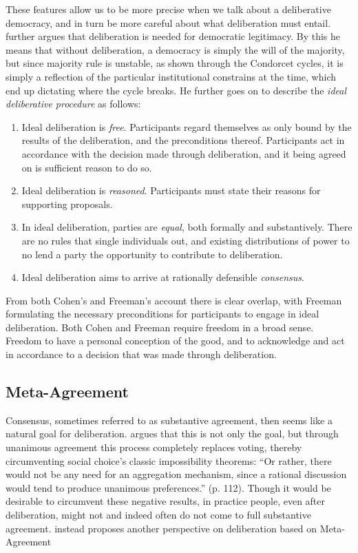 These features allow us to be more precise when we talk about a deliberative
democracy, and in turn be more careful about what deliberation must entail.
\citet{cohenDeliberationDemocraticLegimitimacy2002} further argues that
deliberation is needed for democratic legitimacy. By this he means that without
deliberation, a democracy is simply the will of the majority, but since
majority rule is unstable, as shown through the Condorcet cycles, it is simply
a reflection of the particular institutional constrains at the time, which end
up dictating where the cycle breaks. He further goes on to describe the
\emph{ideal deliberative procedure} as follows:

\begin{enumerate}
	\label{list:ideal-deliberation}
	\setlength\itemsep{1px}
	\item  Ideal deliberation is \emph{free}. Participants regard themselves as only bound by the results of the deliberation, and the preconditions thereof. Participants act in accordance with the decision made through deliberation, and it being agreed on is sufficient reason to do so.
	\item  Ideal deliberation is \emph{reasoned}. Participants must
	      state their reasons for supporting proposals.
	\item  In ideal deliberation, parties are \emph{equal}, both formally
	      and substantively. There are no rules that single individuals
	      out, and existing distributions of power to no lend a party the
	      opportunity to contribute to deliberation.
	\item  Ideal deliberation aims to arrive at rationally defensible \emph{consensus}.
\end{enumerate}

From both Cohen's and Freeman's account there is clear overlap, with Freeman
formulating the necessary preconditions for participants to engage in ideal
deliberation. Both Cohen and Freeman  require freedom in a broad sense. Freedom
to have a personal conception of the good, and to acknowledge and act in
accordance to a decision that was made through deliberation.

\subsection{Meta-Agreement}
\label{subsection:Meta-agreement}

Consensus, sometimes referred to as substantive agreement, then seems like a
natural goal for deliberation. \citet{elsterMarketForumThree2002} argues that
this is not only the goal, but through unanimous agreement this process
completely replaces voting, thereby circumventing social choice's classic impossibility
theorems: ``Or rather, there would not be any need for an aggregation mechanism,
since a rational discussion would tend to produce unanimous preferences.'' (p.
112). Though it would be desirable to circumvent these negative results,
in practice people, even after deliberation, might not and indeed often do not
come to full substantive agreement. \citet{listTwoConceptsAgreement2002}
instead proposes another perspective  on deliberation based on Meta-Agreement

